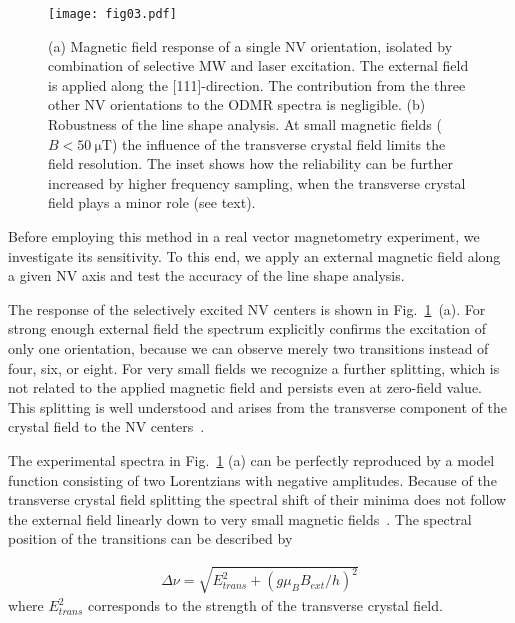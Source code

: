 \documentclass[
 reprint,
 amsmath,
 amssymb,
aps,
 prb,
showpacs
]{revtex4-1}
\begin{document}
\begin{figure}[t]
\texttt{[image: fig03.pdf]}
\caption{(a) Magnetic field response of a single NV orientation, isolated by combination of selective MW and laser excitation. The external field is applied along the [111]-direction. The contribution from the three other NV orientations to the ODMR spectra is negligible. (b) Robustness of the line shape analysis. At small magnetic fields ($B < \SI{50}{\micro\tesla}$) the influence of the transverse crystal field limits the field resolution. The inset shows how the reliability can be further increased by higher frequency sampling, when the transverse crystal field plays a minor role (see text).}
\label{fig:03}
\end{figure}

Before employing this method in a real vector magnetometry experiment, we investigate its sensitivity. To this end, we apply an external magnetic field along a given NV axis and test the accuracy of the line shape analysis.

The response of the selectively excited NV centers is shown in Fig.~\ref{fig:03}~(a). For strong enough external field the spectrum explicitly confirms the excitation of only one orientation, because we can observe merely two transitions instead of four, six, or eight. For very small fields we recognize a further splitting, which is not related to the applied magnetic field and persists even at zero-field value. This splitting is well understood and arises from the transverse component of the crystal field to the NV centers~\cite{PhysRevB.53.13441}.

The experimental spectra in Fig.~\ref{fig:03} (a) can be perfectly reproduced by a model function consisting of two Lorentzians with negative amplitudes. Because of the transverse crystal field splitting the spectral shift of their minima does not follow the external field linearly down to very small magnetic fields~\cite{abragam}. The spectral position of the transitions can be described by

\begin{align}
\Delta \nu = \sqrt{E^2_{trans} + \left( g \mu_B B_{ext} / h \right)^2} 
\label{eq:shift}
\end{align} 
%
where $E^2_{trans}$ corresponds to the strength of the transverse crystal field.
\end{document}
